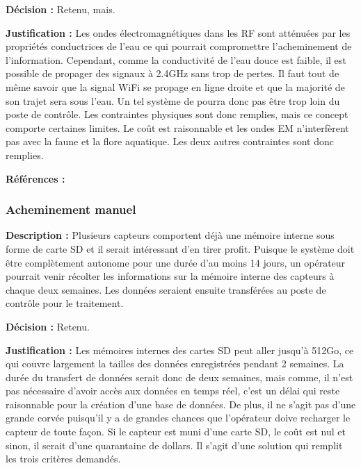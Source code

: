 \textbf{Décision :} Retenu, mais.
 
\textbf{Justification :} Les ondes électromagnétiques dans les RF sont atténuées par les propriétés conductrices de l'eau ce qui pourrait compromettre l'acheminement de l'information. Cependant, comme la conductivité de l'eau douce est faible, il est possible de propager des signaux à 2.4GHz sans trop de pertes. Il faut tout de même savoir que la signal WiFi se propage en ligne droite et que la majorité de son trajet sera sous l'eau. Un tel système de pourra donc pas être trop loin du poste de contrôle. Les contraintes physiques sont donc remplies, mais ce concept comporte certaines limites. Le coût est raisonnable et les ondes EM n'interfèrent pas avec la faune et la flore aquatique. Les deux autres contraintes sont donc remplies. 

\textbf{Références :} \cite{Raspberry_Pi} \cite{Routeur} \cite{eau_EM}

\subsubsection{Acheminement manuel}
\textbf{Description :} Plusieurs capteurs comportent déjà une mémoire interne sous forme de carte SD et il serait intéressant d'en tirer profit. Puisque le système doit être complètement autonome pour une durée d'au moins 14 jours, un opérateur pourrait venir récolter les informations sur la mémoire interne des capteurs à chaque deux semaines. Les données seraient ensuite transférées au poste de contrôle pour le traitement.
 
\textbf{Décision :} Retenu.
 
\textbf{Justification :} Les mémoires internes des cartes SD peut aller jusqu'à 512Go, ce qui couvre largement la tailles des données enregistrées pendant 2 semaines. La durée du transfert de données serait donc de deux semaines, mais comme, il n'est pas nécessaire d'avoir accès aux données en temps réel, c'est un délai qui reste raisonnable pour la création d'une base de données. De plus, il ne s'agit pas d'une grande corvée puisqu'il y a de grandes chances que l'opérateur doive recharger le capteur de toute façon. Si le capteur est muni d'une carte SD, le coût est nul et sinon, il serait d'une quarantaine de dollars. Il s'agit d'une solution qui remplit les trois critères demandés.

